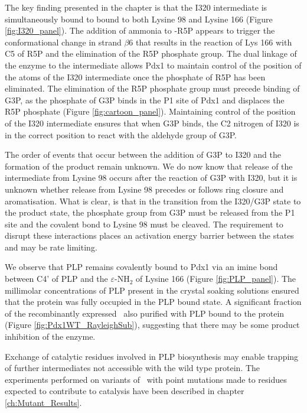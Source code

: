 The key finding presented in the chapter is that the I320 intermediate is simultaneously bound to  bound to both Lysine 98 and Lysine 166 (Figure \ref{fig:I320_panel}). The addition of ammonia to \atpdx -R5P appears to trigger the conformational change in strand $\beta$6 that results in the reaction of Lys 166 with C5 of R5P and the elimination of the R5P phosphate group. The dual linkage of the enzyme to the intermediate allows Pdx1 to maintain control of the position of the atoms of the I320 intermediate once the phosphate of R5P has been eliminated. The elimination of the R5P phosphate group must precede binding of G3P, as the phosphate of G3P binds in the P1 site of Pdx1 and displaces the R5P phosphate (Figure \ref{fig:cartoon_panel}). Maintaining control of the position of the I320 intermediate ensures that when G3P binds, the C2 nitrogen of I320 is in the correct position to react with the aldehyde group of G3P.      

The order of events that occur between the addition of G3P to I320 and the formation of the product remain unknown. We do now know that release of the intermediate from Lysine 98 occurs after the reaction of G3P with I320, but it is unknown whether release from Lysine 98 precedes or follows ring closure and aromatisation. What is clear, is that in the transition from the I320/G3P state to the product state, the phosphate group from G3P must be released from the P1 site and the covalent bond to Lysine 98 must be cleaved. The requirement to disrupt these interactions places an activation energy barrier between the states and may be rate limiting. 

We observe that PLP remains covalently bound to Pdx1 via an imine bond between C4' of PLP and the $\varepsilon$-NH$_2$ of Lysine 166 (Figure \ref{fig:PLP_panel}). The millimolar concentrations of PLP present in the crystal soaking solutions ensured that the protein was fully occupied in the PLP bound state. A significant fraction of the recombinantly expressed \atpdx ~also purified with PLP bound to the protein (Figure \ref{fig:Pdx1WT_RayleighSub}), suggesting that there may be some product inhibition of the enzyme. 

Exchange of catalytic residues involved in PLP biosynthesis may enable trapping of further intermediates not accessible with the wild type protein. The experiments performed on variants of \atpdx ~with point mutations made to residues expected to contribute to catalysis have been described in chapter \ref{ch:Mutant_Results}.   

